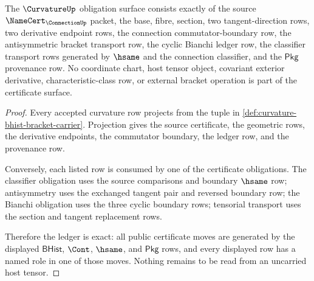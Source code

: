 \begin{theorem}
\label{thm:curvature-ledger-exactness-obligation}
The $\CurvatureUp$ obligation surface consists exactly of the source $\NameCert_{\ConnectionUp}$ packet, the base, fibre, section, two tangent-direction rows, two derivative endpoint rows, the connection commutator-boundary row, the antisymmetric bracket transport row, the cyclic Bianchi ledger row, the classifier transport rows generated by $\hsame$ and the connection classifier, and the $\mathsf{Pkg}$ provenance row. No coordinate chart, host tensor object, covariant exterior derivative, characteristic-class row, or external bracket operation is part of the certificate surface.
\end{theorem}
\begin{proof}
Every accepted curvature row projects from the tuple in \autoref{def:curvature-bhist-bracket-carrier}. Projection gives the source certificate, the geometric rows, the derivative endpoints, the commutator boundary, the ledger row, and the provenance row.

Conversely, each listed row is consumed by one of the certificate obligations. The classifier obligation uses the source comparisons and boundary $\hsame$ row; antisymmetry uses the exchanged tangent pair and reversed boundary row; the Bianchi obligation uses the three cyclic boundary rows; tensorial transport uses the section and tangent replacement rows.

Therefore the ledger is exact: all public certificate moves are generated by the displayed $\mathsf{BHist}$, $\Cont$, $\hsame$, and $\mathsf{Pkg}$ rows, and every displayed row has a named role in one of those moves. Nothing remains to be read from an uncarried host tensor.
\end{proof}

